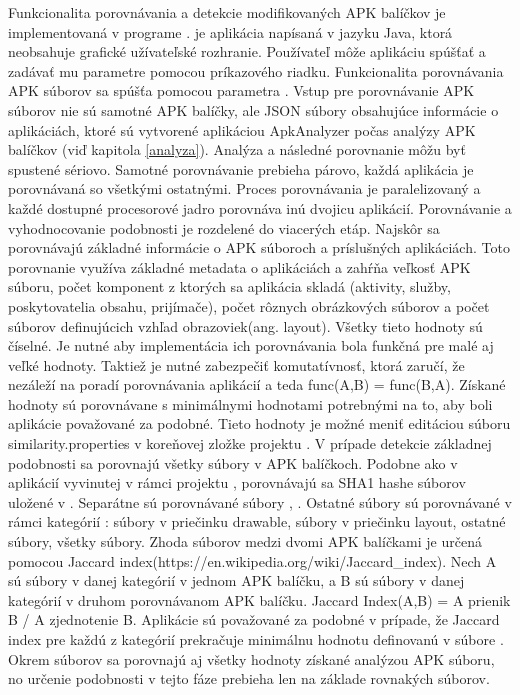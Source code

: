 Funkcionalita porovnávania a detekcie modifikovaných APK balíčkov je implementovaná v programe .  je aplikácia napísaná v jazyku Java, ktorá neobsahuje grafické užívateľské rozhranie. Používateľ môže aplikáciu spúšťať a zadávať mu parametre pomocou príkazového riadku. Funkcionalita porovnávania APK súborov sa spúšťa pomocou parametra . Vstup pre porovnávanie APK súborov nie sú samotné APK balíčky, ale JSON súbory obsahujúce informácie o aplikáciách, ktoré sú vytvorené aplikáciou ApkAnalyzer počas analýzy APK balíčkov (viď kapitola \ref{analyza}). Analýza a následné porovnanie môžu byť spustené sériovo. Samotné porovnávanie prebieha párovo, každá aplikácia je porovnávaná so všetkými ostatnými. Proces porovnávania je paralelizovaný a každé dostupné procesorové jadro porovnáva inú dvojicu aplikácií. 
Porovnávanie a vyhodnocovanie podobnosti je rozdelené do viacerých etáp. Najskôr sa porovnávajú základné informácie o APK súboroch a príslušných aplikáciách. Toto porovnanie využíva základné metadata o aplikáciách a zahŕňa veľkosť APK súboru, počet komponent z ktorých sa aplikácia skladá (aktivity, služby, poskytovatelia obsahu, prijímače), počet rôznych obrázkových súborov a počet súborov definujúcich vzhľad obrazoviek(ang. layout). Všetky tieto hodnoty sú číselné. Je nutné aby implementácia ich porovnávania bola funkčná pre malé aj veľké hodnoty. Taktiež je nutné zabezpečiť komutatívnosť, ktorá zaručí, že nezáleží na poradí porovnávania aplikácií a teda func(A,B) = func(B,A). Získané hodnoty sú porovnávane s minimálnymi hodnotami potrebnými na to, aby boli aplikácie považované za podobné. Tieto hodnoty je možné meniť editáciou súboru similarity.properties v koreňovej zložke projektu .
V prípade detekcie základnej podobnosti sa porovnajú všetky súbory v APK balíčkoch. Podobne ako v aplikácií vyvinutej v rámci projektu , porovnávajú sa SHA1 hashe súborov uložené v . Separátne sú porovnávané súbory , . Ostatné súbory sú porovnávané v rámci kategórií : súbory v priečinku drawable, súbory v priečinku layout, ostatné súbory, všetky súbory. Zhoda súborov medzi dvomi APK balíčkami je určená pomocou Jaccard index(https://en.wikipedia.org/wiki/Jaccard\_index). Nech A sú súbory v danej kategórií v jednom APK balíčku, a B sú súbory v danej kategórií v druhom porovnávanom APK balíčku. Jaccard Index(A,B) = A prienik B / A zjednotenie B. Aplikácie sú považované za podobné v prípade, že Jaccard index pre každú z kategórií prekračuje minimálnu hodnotu definovanú v súbore . Okrem súborov sa porovnajú aj všetky hodnoty získané analýzou APK súboru, no určenie podobnosti v tejto fáze prebieha len na základe rovnakých súborov. 

